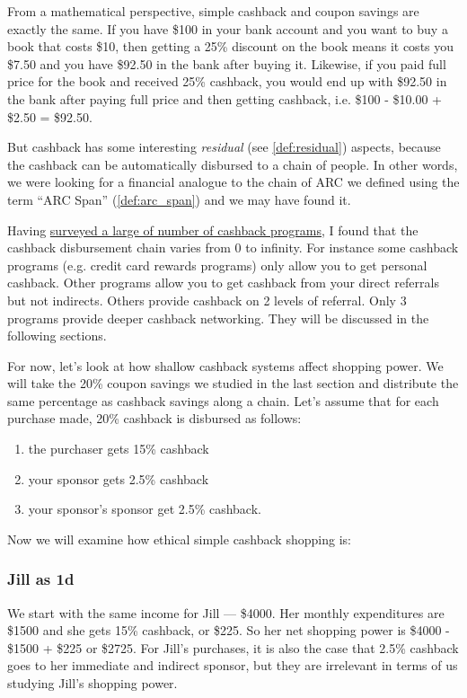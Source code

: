 \documentclass{article}%
\begin{document}
From a mathematical perspective, simple cashback and coupon savings are exactly the same. If you have \$100 in your bank account and you want to buy a book that costs \$10, then getting a 25\% discount on the book means it costs you \$7.50 and you have \$92.50 in the bank after buying it. Likewise, if you paid full price for the book and received 25\% cashback, you would end up with \$92.50 in the bank after paying full price and then getting cashback, i.e. \$100 - \$10.00 + \$2.50 = \$92.50.

But cashback has some interesting \emph{residual} (see \ref{def:residual}) aspects, because the cashback can be automatically disbursed to a chain of people. In other words, we were looking for a financial analogue to the chain of ARC we defined using the term ``ARC Span'' (\ref{def:arc_span}) and we may have found it.

Having \href{http://www.CashbackPrograms.info/report}{surveyed a large of number of cashback programs}, I found that the cashback disbursement chain varies from 0 to infinity. For instance some cashback programs (e.g. credit card rewards programs) only allow you to get personal cashback. Other programs allow you to get cashback from your direct referrals but not indirects. Others provide cashback on 2 levels of referral. Only 3 programs provide deeper cashback networking. They will be discussed in the following sections.

For now, let's look at how shallow cashback systems affect shopping power. We will take the 20\% coupon savings we studied in the last section and distribute the same percentage as cashback savings along a chain. Let's assume that for each purchase made, 20\% cashback is disbursed as follows:

\begin{enumerate}
\item    the purchaser gets 15\% cashback
\item    your sponsor gets 2.5\% cashback
\item    your sponsor's sponsor get 2.5\% cashback.
\end{enumerate}

Now we will examine how ethical simple cashback shopping is:

\subsubsection{Jill as 1d}

We start with the same income for Jill --- \$4000. Her monthly expenditures are \$1500 and she gets 15\% cashback, or \$225. So her net shopping power is \$4000 - \$1500 + \$225 or \$2725. For Jill's purchases, it is also the case that 2.5\% cashback goes to her immediate and indirect sponsor, but they are irrelevant in terms of us studying Jill's shopping power.
\end{document}
